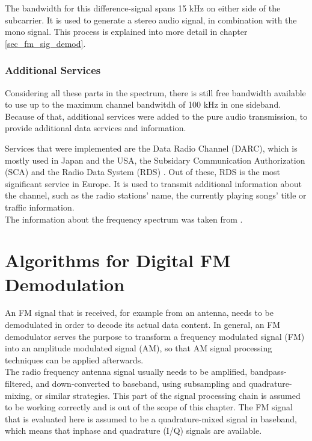 The bandwidth for this difference-signal spans 15 kHz on either side of the subcarrier.
It is used to generate a stereo audio signal, in combination with the mono signal.
This process is explained into more detail in chapter \ref{sec_fm_sig_demod}.

\subsubsection{Additional Services}

Considering all these parts in the spectrum, there is still free bandwidth available to use up to the maximum channel bandwitdh of 100 kHz in one sideband.
Because of that, additional services were added to the pure audio transmission, to provide additional data services and information.

Services that were implemented are the Data Radio Channel (DARC), which is mostly used in Japan and the USA, the Subsidary Communication Authorization (SCA) and the Radio Data System (RDS) \cite{ref_rohde_u_schwarz}.
Out of these, RDS is the most significant service in Europe.
It is used to transmit additional information about the channel, such as the radio stations' name, the currently playing songs' title or traffic information.\\

\noindent
The information about the frequency spectrum was taken from \cite{ref_fm_broadcast_tutorial_and_basics}.

\section{Algorithms for Digital FM Demodulation}

An FM signal that is received, for example from an antenna, needs to be demodulated in order to decode its actual data content.
In general, an FM demodulator serves the purpose to transform a frequency modulated signal (FM) into an amplitude modulated signal (AM), so that AM signal processing techniques can be applied afterwards.\\

The radio frequency antenna signal usually needs to be amplified, bandpass-filtered, and down-converted to baseband, using subsampling and quadrature-mixing, or similar strategies.
This part of the signal processing chain is assumed to be working correctly and is out of the scope of this chapter. %
The FM signal that is evaluated here is assumed to be a quadrature-mixed signal in baseband, which means that inphase and quadrature (I/Q) signals are available.

